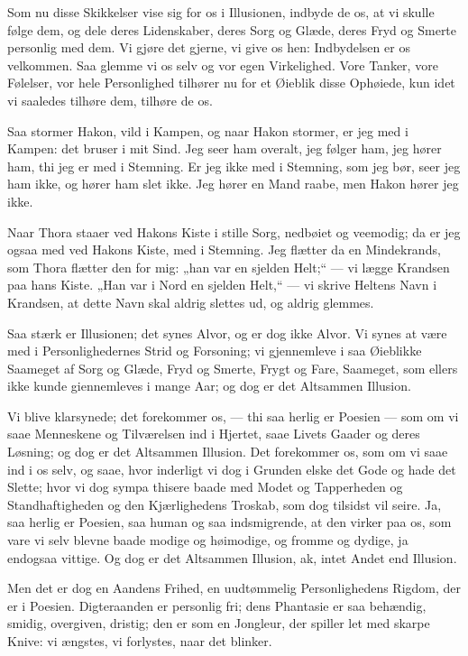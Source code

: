 \documentclass[12pt,a4paper]{book}
\newcommand{\apage}[1]{\marginnote{\footnotesize\textit{[#1]}}}
\begin{document}
Som nu disse Skikkelser vise sig for os i Illusionen, indbyde de os, at vi
skulle følge dem, og dele deres Lidenskaber, deres Sorg og Glæde, deres Fryd
og Smerte personlig med dem. Vi gjøre det gjerne, vi give os hen: Indbydelsen
er os velkommen. Saa glemme vi os selv og vor egen Virkelighed. Vore Tanker,
vore Følelser, vor hele Personlighed tilhører nu for et Øieblik disse
Ophøiede, kun idet vi saaledes tilhøre dem, tilhøre de os.

Saa stormer Hakon, vild i Kampen, og naar Hakon stormer, er jeg med i Kampen:
det bruser i mit Sind. Jeg seer ham overalt, jeg følger ham, jeg hører ham,
thi jeg er med i Stemning. Er jeg ikke med i Stemning, som jeg bør, seer jeg
ham ikke, og hører ham slet ikke. Jeg hører en Mand raabe, men Hakon hører jeg
ikke.

Naar Thora staaer ved Hakons Kiste i stille Sorg, nedbøiet og veemodig; da er
jeg ogsaa med ved Hakons Kiste, med i Stemning. Jeg flætter da en Mindekrands,
som Thora flætter den for mig: „han var en sjelden Helt;“ --- vi lægge
Krandsen paa hans Kiste. „Han var i Nord en sjelden Helt,“ --- vi skrive
Heltens Navn i Krandsen, at dette Navn skal aldrig slettes ud, og aldrig
glemmes.

Saa stærk er Illusionen; det synes Alvor, og er dog ikke Alvor. Vi synes at
være med i Personlighedernes Strid og Forsoning; vi gjennemleve i saa
Øieblikke Saameget af Sorg og Glæde, Fryd og Smerte, Frygt og Fare, Saameget,
som ellers ikke kunde giennemleves i mange Aar; og dog er det Altsammen
Illusion.

Vi blive klarsynede; det forekommer os, --- thi saa herlig er Poesien --- som
om vi saae Menneskene og Tilværelsen ind i Hjertet, saae Livets Gaader og
deres Løsning; og dog er det Altsammen Illusion. Det forekommer os, som om vi
saae ind i os selv, og saae, hvor inderligt vi dog i Grunden elske det Gode og
hade det Slette; hvor vi dog sympa\-%
 \apage{14}thisere baade med Modet og Tapperheden og Standhaftigheden og den
Kjærlighedens Troskab, som dog tilsidst vil seire. Ja, saa herlig er Poesien,
saa human og saa indsmigrende, at den virker paa os, som vare vi selv blevne
baade modige og høimodige, og fromme og dydige, ja endogsaa vittige. Og dog er
det Altsammen Illusion, ak, intet Andet end Illusion.

Men det er dog en Aandens Frihed, en uudtømmelig Personlighedens Rigdom, der
er i Poesien. Digteraanden er personlig fri; dens Phantasie er saa behændig,
smidig, overgiven, dristig; den er som en Jongleur, der spiller let med skarpe
Knive: vi ængstes, vi forlystes, naar det blinker.
\end{document}
